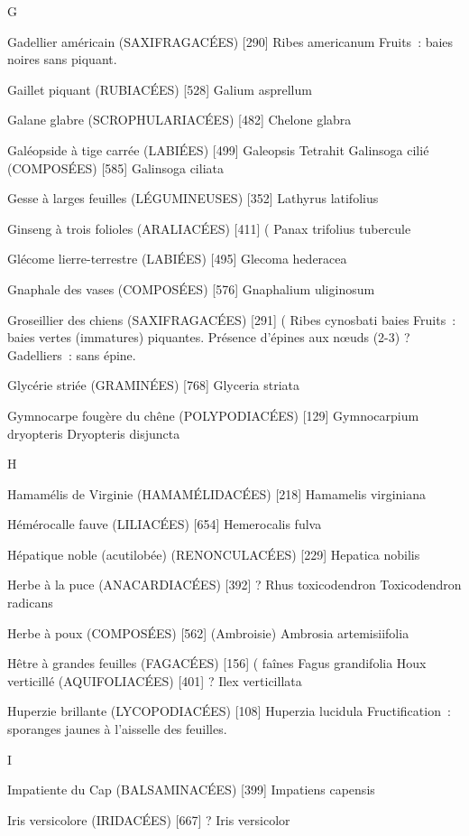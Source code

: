 \documentclass[book,12pt,a4paper,onecolumn,openany]{memoir}
\begin{document}
G

Gadellier américain (SAXIFRAGACÉES)  [290]
				Ribes americanum
Fruits : baies noires sans piquant.

Gaillet piquant (RUBIACÉES)  [528]
				Galium asprellum

Galane glabre (SCROPHULARIACÉES)  [482]
				Chelone glabra

Galéopside à tige carrée (LABIÉES)  [499]
				Galeopsis Tetrahit
Galinsoga cilié (COMPOSÉES)  [585]
				Galinsoga ciliata

Gesse à larges feuilles (LÉGUMINEUSES)  [352]
				Lathyrus latifolius

Ginseng à trois folioles (ARALIACÉES)  [411]		(
				Panax trifolius				tubercule

Glécome lierre-terrestre (LABIÉES)  [495]
				Glecoma hederacea

Gnaphale des vases (COMPOSÉES)  [576]
				Gnaphalium uliginosum

Groseillier des chiens (SAXIFRAGACÉES)  [291]			(
				Ribes cynosbati					baies
Fruits : baies vertes (immatures) piquantes.
Présence d’épines aux nœuds (2-3) ? Gadelliers : sans épine.

Glycérie striée (GRAMINÉES)  [768]
				Glyceria striata


Gymnocarpe fougère du chêne (POLYPODIACÉES) [129]
				Gymnocarpium dryopteris
				Dryopteris disjuncta

H

Hamamélis de Virginie (HAMAMÉLIDACÉES)  [218]
				Hamamelis virginiana

Hémérocalle fauve (LILIACÉES)  [654]
				Hemerocalis fulva

Hépatique noble (acutilobée) (RENONCULACÉES)  [229]
				Hepatica nobilis

Herbe à la puce (ANACARDIACÉES)  [392]			?
				Rhus toxicodendron
				Toxicodendron radicans

Herbe à poux (COMPOSÉES)  [562]  (Ambroisie)
				Ambrosia artemisiifolia

Hêtre à grandes feuilles (FAGACÉES)  [156]			( faînes
				Fagus grandifolia
Houx verticillé (AQUIFOLIACÉES)  [401]			?
				Ilex verticillata

Huperzie brillante (LYCOPODIACÉES)  [108]
				Huperzia lucidula
Fructification : sporanges jaunes à l’aisselle des feuilles.

I

Impatiente du Cap (BALSAMINACÉES)  [399]
				Impatiens capensis

Iris versicolore (IRIDACÉES)  [667]				?
				Iris versicolor
\end{document}

